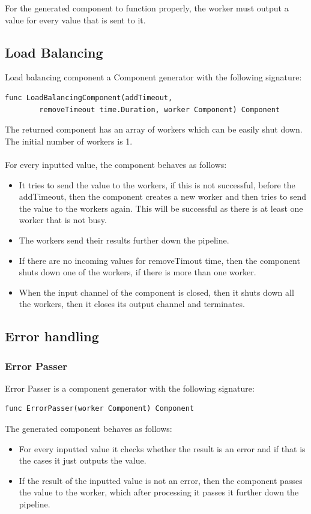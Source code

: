 \documentclass[12pt,a4paper]{article}
\begin{document}
For the generated component to function properly, the worker must output
a value for every value that is sent to it.

\subsection{Load Balancing}
Load balancing component a Component generator with the following signature:
\begin{lstlisting}
func LoadBalancingComponent(addTimeout, 
		removeTimeout time.Duration, worker Component) Component
\end{lstlisting}
The returned component has an array of workers which can be easily shut down.
The initial number of workers is 1. 
\\
\\
For every inputted value, the component behaves as follows:
\begin{itemize}
	\item It tries to send the value to the workers, if this is not successful, 
				before the addTimeout, then the component creates a new worker and then
				tries to send the value to the workers again. This will be successful as
				there is at least one worker that is not busy.
	\item The workers send their results further down the pipeline.
	\item If there are no incoming values for removeTimout time, then the component
				shuts down one of the workers, if there is more than one worker.
	\item When the input channel of the component is closed, then it shuts down all
				the workers, then it closes its output channel and terminates.

\end{itemize}

\subsection{Error handling}
\subsubsection{Error Passer}
Error Passer is a component generator with the following signature:

\begin{lstlisting}
func ErrorPasser(worker Component) Component
\end{lstlisting}
The generated component behaves as follows:
\begin{itemize}
	\item For every inputted value it checks whether the result is an error
				and if that is the cases it just outputs the value.
	\item If the result of the inputted value is not an error, then the component
				passes the value to the worker, which after processing it passes 
				it further down the pipeline.
\end{itemize}
\end{document}

